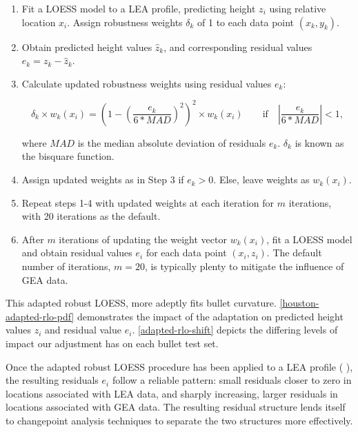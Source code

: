 \documentclass[12pt]{article}
\begin{document}
\begin{enumerate}

\item Fit a LOESS model to a LEA profile, predicting height $z_i$ using relative location $x_i$. Assign robustness weights $\delta_k$ of 1 to each data point $(x_k, y_k)$.  
\item Obtain predicted height values $\widehat{z}_k$, and corresponding residual values $e_k = z_k - \widehat{z}_k$. 
\item Calculate updated robustness weights using residual values $e_k$: 

$$\delta_k \times w_k(x_i) =\left(1 - \left(\frac{e_k}{6*MAD}\right)^2\right)^2 \times w_k(x_i) \quad \quad \mbox{if}\quad \left|\frac{e_k}{6*MAD} \right| < 1,$$

where $MAD$ is the median absolute deviation of residuals $e_k$. $\delta_k$ is known as the bisquare function.  
\item Assign updated weights as in Step 3 if $e_k > 0$. Else, leave weights as $w_k(x_i)$. 
\item Repeat steps 1-4 with updated weights at each iteration for $m$ iterations, with 20 iterations as the default.  
\item After $m$ iterations of updating the weight vector $w_k(x_i)$, fit a LOESS model and obtain residual values $e_i$ for each data point $(x_i, z_i)$. The default number of iterations, $m = 20$, is typically plenty to mitigate the influence of GEA data. 


\end{enumerate}

This adapted robust LOESS, more adeptly fits bullet curvature.
\autoref{houston-adapted-rlo-pdf} demonstrates the impact of the
adaptation on predicted height values \(z_i\) and residual value
\(e_i\). \autoref{adapted-rlo-shift} depicts the differing levels of
impact our adjustment has on each bullet test set.
{\color{teal}{Once I have more barrel information, I could go into a little more detail here about differing barrel types/ammo types or something, but no more than a sentence to bring the point home.}}

Once the adapted robust LOESS procedure has been applied to a LEA
profile ({\color{purple}{Did you describe this anywhere?}}
{\color{teal}{That is what is described above; the process applied to LEA profiles.}}),
the resulting residuals \(e_i\) follow a reliable pattern: small
residuals closer to zero in locations associated with LEA data, and
sharply increasing, larger residuals in locations associated with GEA
data. The resulting residual structure lends itself to changepoint
analysis techniques to separate the two structures more effectively.
\end{document}

